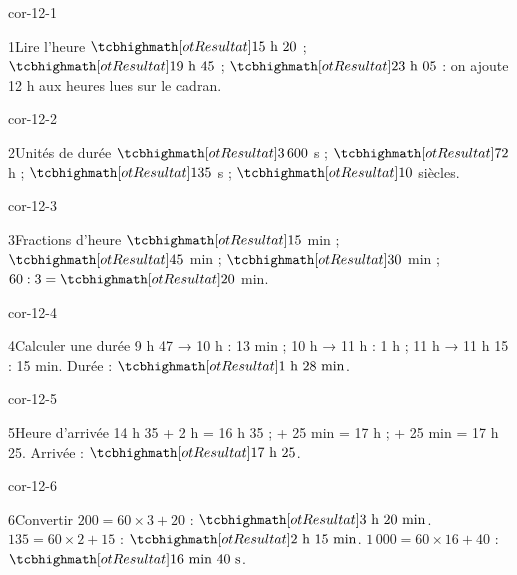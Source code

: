 \clearpage\pagestyle{otMain}\setlength{\otBlocEspacement}{2.5mm}\fontsize{11}{15}\selectfont{}
\begin{blocLivre}{cor-12-1}\begin{corrige}{1}{Lire l’heure}
$\res{15\text{ h }20}$ ; $\res{19\text{ h }45}$ ; $\res{23\text{ h }05}$ : on ajoute 12 h aux heures lues sur le cadran.
\label{fig-cor-12-1}
\end{corrige}\end{blocLivre}
\begin{blocLivre}{cor-12-2}\begin{corrige}{2}{Unités de durée}
$\res{3\,600}$ s ; $\res{72}$ h ; $\res{135}$ s ; $\res{10}$ siècles.
\end{corrige}\end{blocLivre}
\begin{blocLivre}{cor-12-3}\begin{corrige}{3}{Fractions d’heure}
$\res{15}$ min ; $\res{45}$ min ; $\res{30}$ min ; $60:3=\res{20}$ min.
\end{corrige}\end{blocLivre}
\begin{blocLivre}{cor-12-4}\begin{corrige}{4}{Calculer une durée}
9 h 47 → 10 h : 13 min ; 10 h → 11 h : 1 h ; 11 h → 11 h 15 : 15 min. Durée : $\res{1\text{ h }28\text{ min}}$.
\end{corrige}\end{blocLivre}
\begin{blocLivre}{cor-12-5}\begin{corrige}{5}{Heure d’arrivée}
14 h 35 + 2 h = 16 h 35 ; + 25 min = 17 h ; + 25 min = 17 h 25. Arrivée : $\res{17\text{ h }25}$.
\end{corrige}\end{blocLivre}
\begin{blocLivre}{cor-12-6}\begin{corrige}{6}{Convertir}
$200=60\times3+20$ : $\res{3\text{ h }20\text{ min}}$. $135=60\times2+15$ : $\res{2\text{ h }15\text{ min}}$. $1\,000=60\times16+40$ : $\res{16\text{ min }40\text{ s}}$.
\end{corrige}\end{blocLivre}

